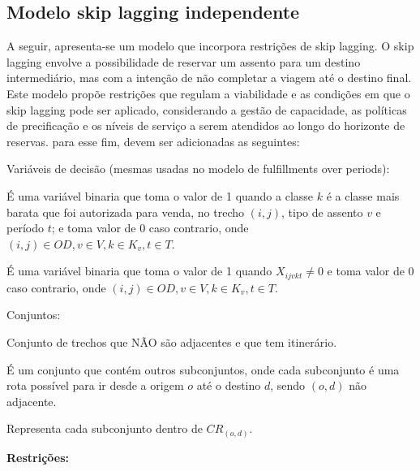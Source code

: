 \subsection{Modelo skip lagging independente}
A seguir, apresenta-se um modelo que incorpora restrições de skip lagging. O skip lagging envolve a possibilidade de reservar um assento para um destino intermediário, mas com a intenção de não completar a viagem até o destino final. Este modelo propõe restrições que regulam a viabilidade e as condições em que o skip lagging pode ser aplicado, considerando a gestão de capacidade, as políticas de precificação e os níveis de serviço a serem atendidos ao longo do horizonte de reservas. para esse fim, devem ser adicionadas as seguintes:

Variáveis de decisão (mesmas usadas no modelo de fulfillments over periods):
\begin{description}[style=unboxed, leftmargin=2.5cm, labelindent=1.5cm]
	\setlength{\itemsep}{-2.2em} %
	\setlength{\parskip}{0em} %
	\item[$\beta_{ijvkt}:$] É uma variável binaria que toma o valor de 1 quando a classe $k$ é a classe mais barata que foi autorizada para venda, no trecho $(i,j)$, tipo de assento $v$ e período $t$; e toma  valor de 0 caso contrario, onde $(i,j) \in OD, v \in V, k \in K_v, t \in T$.  \\
	\item[$\alpha_{ijvkt}:$] É uma variável binaria que toma o valor de 1 quando $X_{ijvkt} \neq 0$ e toma  valor de 0 caso contrario, onde $(i,j) \in OD, v \in V, k \in K_v, t \in T$.
\end{description}
Conjuntos:
\begin{description}[style=unboxed, leftmargin=2.5cm, labelindent=1.5cm]
	\setlength{\itemsep}{-2.2em} %
	\setlength{\parskip}{0em} %
	      \item[$NAD:$] Conjunto de trechos que NÃO são adjacentes e que tem itinerário.\\
	      \item[$CR_{(o,d)}:$] É um conjunto que contém outros subconjuntos, onde cada subconjunto é uma rota possível para ir desde a origem $o$ até o destino $d$, sendo $(o,d)$ não adjacente. \\
	      \item[$S:$] Representa cada subconjunto dentro de $CR_{(o,d)}$.
\end{description}
\textbf{Restrições:}\\
